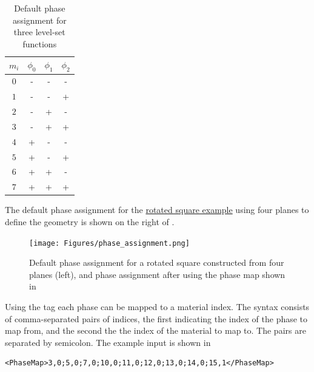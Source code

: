 \begin{table}[H]
\begin{center}
\begin{tabular}{ c|c c c } 
    $m_i$ & $\phi_0$ & $\phi_1$ & $\phi_2$ \\
    \hline
    $0$ & - & - & - \\ 
    $1$ & - & - & + \\ 
    $2$ & - & + & - \\ 
    $3$ & - & + & + \\ 
    $4$ & + & - & - \\ 
    $5$ & + & - & + \\ 
    $6$ & + & + & - \\ 
    $7$ & + & + & + \\ 
\end{tabular}
\caption{Default phase assignment for three level-set functions}
\label{tab:default_phase_assignment}
\end{center}
\end{table}

The default phase assignment for the \href{https://github.com/kkmaute/moris/blob/main/share/doc/mesh_generation/examples/Rotated_Square_Example.xml}{rotated square example} using four planes to define the geometry is shown on the right of . 

\begin{figure}[t]
    \begin{center}
    \texttt{[image: Figures/phase\_assignment.png]}
    \caption{Default phase assignment for a rotated square constructed from four planes (left), and phase assignment after using the phase map shown in } 
    \label{fig:phase_assignment}
    \end{center}
\end{figure}

Using the tag  each phase can be mapped to a material index. The syntax consists of comma-separated pairs of indices, the first indicating the index of the phase to map from, and the second the the index of the material to map to. The pairs are separated by semicolon. The example input is shown in 

\begin{minipage}{\linewidth}
\vspace{0.5cm}
\begin{lstlisting}[caption={Phase map for the material re-assignment shown in \Cref{fig:phase_assignment}},captionpos=b, label={lst:phase_map}]
<PhaseMap>3,0;5,0;7,0;10,0;11,0;12,0;13,0;14,0;15,1</PhaseMap>
\end{lstlisting}
\end{minipage}
    

